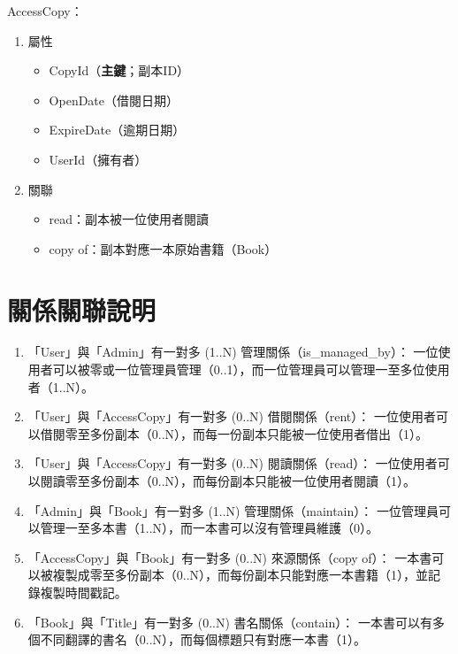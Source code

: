 \hspace*{-2em}AccessCopy：

\begin{enumerate}
\item 屬性
    \begin{itemize}
    \item CopyId（\textbf{主鍵}；副本ID）
    \item OpenDate（借閱日期）
    \item ExpireDate（逾期日期）
    \item UserId（擁有者）
    \end{itemize}
\item 關聯
    \begin{itemize}
    \item read：副本被一位使用者閱讀
    \item copy of：副本對應一本原始書籍（Book）
    \end{itemize}
\end{enumerate}
  


\section{關係關聯說明}

\begin{enumerate}
    \item 「User」與「Admin」有一對多 (1..N) 管理關係（is\_managed\_by）：  
      一位使用者可以被零或一位管理員管理（0..1），而一位管理員可以管理一至多位使用者（1..N）。
    \item 「User」與「AccessCopy」有一對多 (0..N) 借閱關係（rent）：  
      一位使用者可以借閱零至多份副本（0..N），而每一份副本只能被一位使用者借出（1）。
    \item 「User」與「AccessCopy」有一對多 (0..N) 閱讀關係（read）：  
      一位使用者可以閱讀零至多份副本（0..N），而每份副本只能被一位使用者閱讀（1）。
    \item 「Admin」與「Book」有一對多 (1..N) 管理關係（maintain）：  
      一位管理員可以管理一至多本書（1..N），而一本書可以沒有管理員維護（0）。
    \item 「AccessCopy」與「Book」有一對多 (0..N) 來源關係（copy of）：  
      一本書可以被複製成零至多份副本（0..N），而每份副本只能對應一本書籍（1），並記錄複製時間戳記。
    \item 「Book」與「Title」有一對多 (0..N) 書名關係（contain）：  
      一本書可以有多個不同翻譯的書名（0..N），而每個標題只有對應一本書（1）。
  \end{enumerate}
  